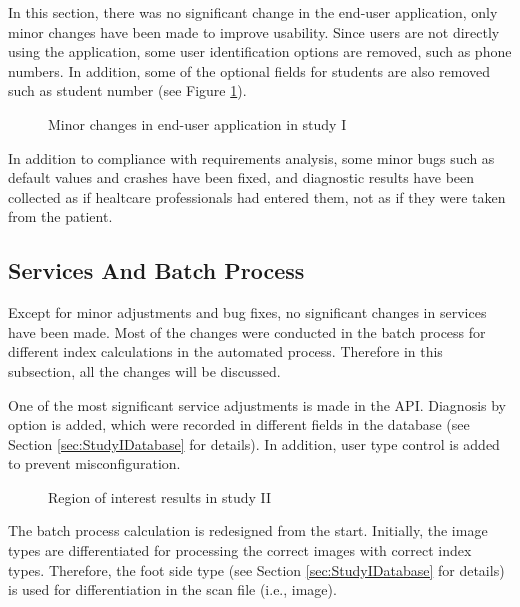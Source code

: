 In this section, there was no significant change in the end-user application, only minor changes have been made to improve usability. Since users are not directly using the application, some user identification options are removed, such as phone numbers. In addition, some of the optional fields for students are also removed such as student number (see Figure \ref{fig:UserApplicationStudyIChanges}).

\begin{figure}[htbp]
\centering
{}
\caption{Minor changes in end-user application in study I}
\label{fig:UserApplicationStudyIChanges}
\end{figure}

In addition to compliance with requirements analysis, some minor bugs such as default values and crashes have been fixed, and diagnostic results have been collected as if healtcare professionals had entered them, not as if they were taken from the patient.

\subsection{Services And Batch Process}

Except for minor adjustments and bug fixes, no significant changes in services have been made. Most of the changes were conducted in the batch process for different index calculations in the automated process. Therefore in this subsection, all the changes will be discussed. 

One of the most significant service adjustments is made in the API. Diagnosis by option is added, which were recorded in different fields in the database (see Section \ref{sec:StudyIDatabase} for details). In addition, user type control is added to prevent misconfiguration.

\begin{figure}[htbp]
\centering
{}
\caption{Region of interest results in study II}
\label{fig:BatchProcessRioStudyII}
\end{figure}

The batch process calculation is redesigned from the start. Initially, the image types are differentiated for processing the correct images with correct index types. Therefore, the foot side type (see Section \ref{sec:StudyIDatabase} for details) is used for differentiation in the scan file (i.e., image).

